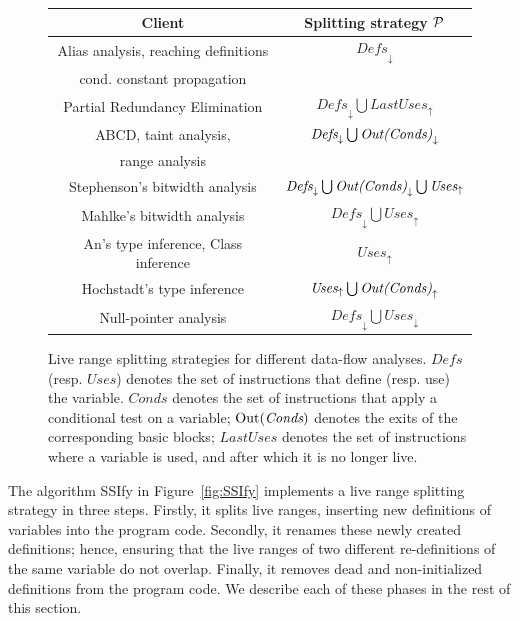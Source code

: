 \begin{figure}[t!]
\begin{center}
\begin{small}
\renewcommand\arraystretch{1.4}
\begin{tabular}{| c | c |} \hline
{\bf Client} & {\bf Splitting strategy ${\cal P}$} \\ \hline 
Alias analysis, reaching definitions & $\textit{Defs}_\downarrow$ \\ 
cond. constant propagation &  \\ \hline  
Partial Redundancy Elimination & $\textit{Defs}_\downarrow \bigcup \textit{LastUses}_\uparrow$ \\ \hline 
ABCD, taint analysis,  & $\textit{Defs}_\downarrow \bigcup \textit{\textrm{Out}(Conds)}_\downarrow$ \\ 
range analysis & \\ \hline 
Stephenson's bitwidth analysis & $\textit{Defs}_\downarrow \bigcup \textit{\textrm{Out}(Conds)}_\downarrow \bigcup \textit{Uses}_\uparrow$  \\ \hline 
Mahlke's bitwidth analysis & $\textit{Defs}_\downarrow \bigcup \textit{Uses}_\uparrow$  \\ \hline 
An's type inference, Class inference & $\textit{Uses}_\uparrow$ \\ \hline 
Hochstadt's type inference & $\textit{Uses}_\uparrow \bigcup \textit{\textrm{Out}(Conds)}_\uparrow$ \\ \hline 
Null-pointer analysis & $\textit{Defs}_\downarrow \bigcup\textit{Uses}_\downarrow$ \\ \hline
\end{tabular} \end{small} 
\caption{Live range splitting strategies for different data-flow analyses.
$\textit{Defs}$ (resp. $\textit{Uses}$) denotes the set of instructions that define (resp. use) the variable. $\textit{Conds}$ denotes the set of instructions that apply a conditional test on a variable; $\textrm{Out}(\textit{Conds})$ denotes the exits of the corresponding basic blocks; $\textit{LastUses}$ denotes the set of instructions where a variable is used, and after which it is no longer live.}
\label{fig:splittingSt} \end{center} \end{figure}

\def\SSIfy{\textsf{SSIfy}}

The algorithm \textsf{\SSIfy} in Figure~\ref{fig:SSIfy} implements a
live range splitting strategy in three steps.
Firstly, it splits live ranges, inserting new definitions of variables into the
program code.
Secondly, it renames these newly created definitions; hence, ensuring that
the live ranges of two different re-definitions of the same variable do not
overlap.
Finally, it removes dead and non-initialized definitions from the program code.
We describe each of these phases in the rest of this section.

